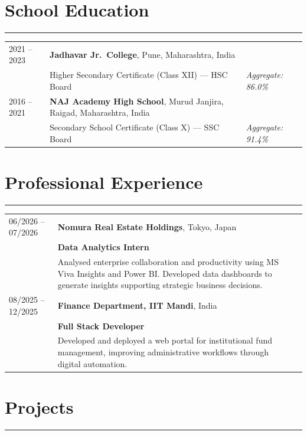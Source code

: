 \documentclass[a4paper,10pt]{article}
\begin{document}
\section*{School Education}
\noindent\rule{\linewidth}{0.6pt}

\begin{tabular}{L M G}
2021 -- 2023 & \textbf{Jadhavar Jr.\ College}, Pune, Maharashtra, India & \\
& Higher Secondary Certificate (Class XII) --- HSC Board & \textit{Aggregate: 86.0\%} \\
2016 -- 2021 & \textbf{NAJ Academy High School}, Murud Janjira, Raigad, Maharashtra, India & \\
& Secondary School Certificate (Class X) --- SSC Board & \textit{Aggregate: 91.4\%} \\
\end{tabular}

\section*{Professional Experience}
\noindent\rule{\linewidth}{0.6pt}

\begin{tabular}{L M G}
06/2026 -- 07/2026 & \textbf{Nomura Real Estate Holdings}, Tokyo, Japan & \\
& \textbf{Data Analytics Intern} & \\
& Analysed enterprise collaboration and productivity using MS Viva Insights and Power BI. Developed data dashboards to generate insights supporting strategic business decisions. & \\
08/2025 -- 12/2025 & \textbf{Finance Department, IIT Mandi}, India & \\
& \textbf{Full Stack Developer} & \\
& Developed and deployed a web portal for institutional fund management, improving administrative workflows through digital automation. &
\end{tabular}

\section*{Projects}
\noindent\rule{\linewidth}{0.6pt}
\end{document}
